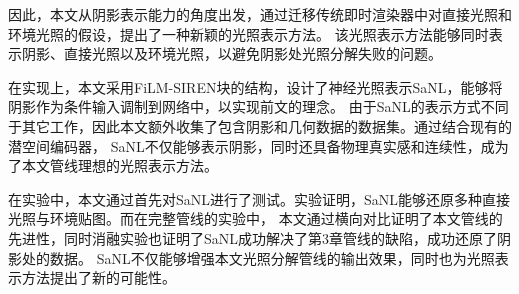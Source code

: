 因此，本文从阴影表示能力的角度出发，通过迁移传统即时渲染器中对直接光照和环境光照的假设，提出了一种新颖的光照表示方法。
该光照表示方法能够同时表示阴影、直接光照以及环境光照，以避免阴影处光照分解失败的问题。

在实现上，本文采用FiLM-SIREN块的结构，设计了神经光照表示SaNL，能够将阴影作为条件输入调制到网络中，以实现前文的理念。
由于SaNL的表示方式不同于其它工作，因此本文额外收集了包含阴影和几何数据的数据集。通过结合现有的潜空间编码器，
SaNL不仅能够表示阴影，同时还具备物理真实感和连续性，成为了本文管线理想的光照表示方法。

在实验中，本文通过首先对SaNL进行了测试。实验证明，SaNL能够还原多种直接光照与环境贴图。而在完整管线的实验中，
本文通过横向对比证明了本文管线的先进性，同时消融实验也证明了SaNL成功解决了第3章管线的缺陷，成功还原了阴影处的数据。
SaNL不仅能够增强本文光照分解管线的输出效果，同时也为光照表示方法提出了新的可能性。

